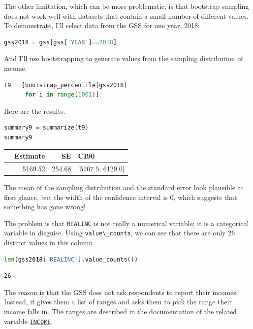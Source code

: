 The other limitation, which can be more problematic, is that bootstrap
sampling does not work well with datasets that contain a small number of
different values. To demonstrate, I'll select data from the GSS for one
year, 2018:

\begin{lstlisting}[language=Python]
gss2018 = gss[gss['YEAR']==2018]
\end{lstlisting}

And I'll use bootstrapping to generate values from the sampling
distribution of income.

\begin{lstlisting}[language=Python]
t9 = [bootstrap_percentile(gss2018)
      for i in range(1001)]
\end{lstlisting}

Here are the results.

\begin{lstlisting}[language=Python]
summary9 = summarize(t9)
summary9
\end{lstlisting}

\begin{tabular}{lrrl}
\toprule
{} &  Estimate &      SE &              CI90 \\
\midrule
{} &   5169.52 &  254.68 &  [5107.5, 6129.0] \\
\bottomrule
\end{tabular}

The mean of the sampling distribution and the standard error look
plausible at first glance, but the width of the confidence interval is
0, which suggests that something has gone wrong!

The problem is that \passthrough{\lstinline!REALINC!} is not really a
numerical variable; it is a categorical variable in disguise. Using
\passthrough{\lstinline!value\_counts!}, we can see that there are only
26 distinct values in this column.

\begin{lstlisting}[language=Python]
len(gss2018['REALINC'].value_counts())
\end{lstlisting}

\begin{lstlisting}[]
26
\end{lstlisting}

The reason is that the GSS does not ask respondents to report their
incomes. Instead, it gives them a list of ranges and asks them to pick
the range their income falls in. The ranges are described in the
documentation of the related variable
\href{https://gssdataexplorer.norc.org/variables/104/vshow}{\passthrough{\lstinline!INCOME!}}.

